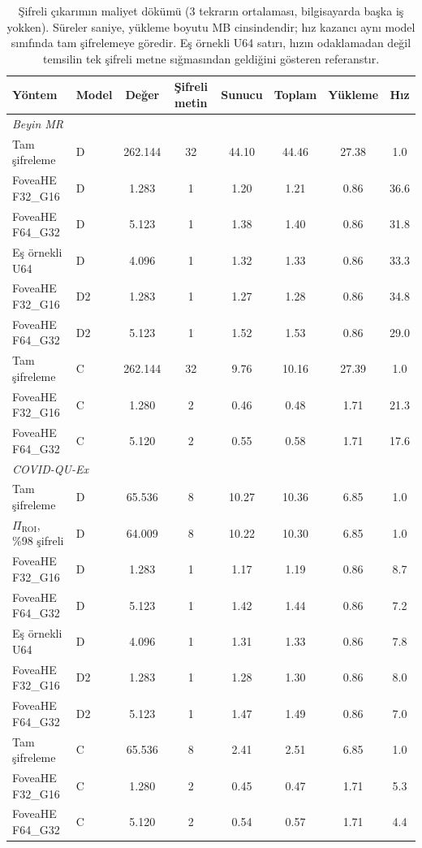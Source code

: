 \begin{table}[h!]
{\setlength{\tabcolsep}{4pt}
\caption{Şifreli çıkarımın maliyet dökümü (3 tekrarın ortalaması, bilgisayarda başka iş yokken). Süreler saniye, yükleme boyutu MB cinsindendir; hız kazancı aynı model sınıfında tam şifrelemeye göredir. Eş örnekli U64 satırı, hızın odaklamadan değil temsilin tek şifreli metne sığmasından geldiğini gösteren referanstır.}
\begin{center}
\vspace{-6mm}
{\footnotesize
\begin{tabular}{llcccccc}
\hline\hline
Yöntem & Model & Değer & Şifreli metin & Sunucu & Toplam & Yükleme & Hız \\
\hline
\multicolumn{8}{l}{\emph{Beyin MR}} \\
Tam şifreleme & D & 262.144 & 32 & 44.10 & 44.46 & 27.38 & 1.0 \\
FoveaHE F32\_G16 & D & 1.283 & 1 & 1.20 & 1.21 & 0.86 & 36.6 \\
FoveaHE F64\_G32 & D & 5.123 & 1 & 1.38 & 1.40 & 0.86 & 31.8 \\
Eş örnekli U64 & D & 4.096 & 1 & 1.32 & 1.33 & 0.86 & 33.3 \\
FoveaHE F32\_G16 & D2 & 1.283 & 1 & 1.27 & 1.28 & 0.86 & 34.8 \\
FoveaHE F64\_G32 & D2 & 5.123 & 1 & 1.52 & 1.53 & 0.86 & 29.0 \\
Tam şifreleme & C & 262.144 & 32 & 9.76 & 10.16 & 27.39 & 1.0 \\
FoveaHE F32\_G16 & C & 1.280 & 2 & 0.46 & 0.48 & 1.71 & 21.3 \\
FoveaHE F64\_G32 & C & 5.120 & 2 & 0.55 & 0.58 & 1.71 & 17.6 \\
\hline
\multicolumn{8}{l}{\emph{COVID-QU-Ex}} \\
Tam şifreleme & D & 65.536 & 8 & 10.27 & 10.36 & 6.85 & 1.0 \\
$\Pi_{\mathrm{ROI}}$, \%98 şifreli & D & 64.009 & 8 & 10.22 & 10.30 & 6.85 & 1.0 \\
FoveaHE F32\_G16 & D & 1.283 & 1 & 1.17 & 1.19 & 0.86 & 8.7 \\
FoveaHE F64\_G32 & D & 5.123 & 1 & 1.42 & 1.44 & 0.86 & 7.2 \\
Eş örnekli U64 & D & 4.096 & 1 & 1.31 & 1.33 & 0.86 & 7.8 \\
FoveaHE F32\_G16 & D2 & 1.283 & 1 & 1.28 & 1.30 & 0.86 & 8.0 \\
FoveaHE F64\_G32 & D2 & 5.123 & 1 & 1.47 & 1.49 & 0.86 & 7.0 \\
Tam şifreleme & C & 65.536 & 8 & 2.41 & 2.51 & 6.85 & 1.0 \\
FoveaHE F32\_G16 & C & 1.280 & 2 & 0.45 & 0.47 & 1.71 & 5.3 \\
FoveaHE F64\_G32 & C & 5.120 & 2 & 0.54 & 0.57 & 1.71 & 4.4 \\
\hline
\end{tabular}}
\vspace{-6mm}
\end{center}
\label{tbl:fovcost}}
\end{table}

